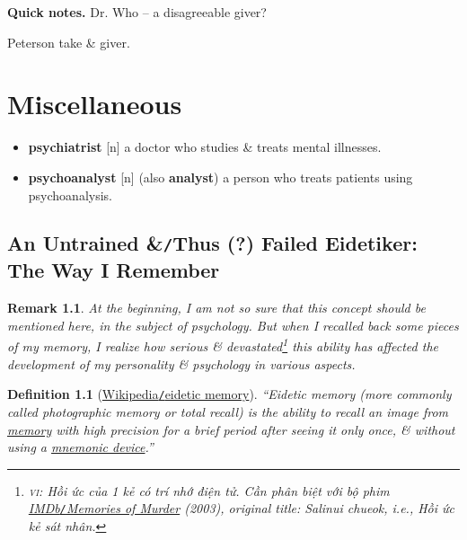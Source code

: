 \documentclass[oneside]{book}
\numberwithin{equation}{section}
\newtheorem{definition}{Definition}[chapter]
\newtheorem{remark}{Remark}[chapter]
\begin{document}
\textbf{Quick notes.} Dr. Who -- a disagreeable giver?

Peterson take \& giver.


\chapter{Miscellaneous}

\begin{itemize}
	\item \textbf{psychiatrist} [n] a doctor who studies \& treats mental illnesses.
	\item \textbf{psychoanalyst} [n] (also \textbf{analyst}) a person who treats patients using psychoanalysis.
\end{itemize}

\section{An Untrained \&\texttt{/}Thus (?) Failed Eidetiker: The Way I Remember}

\begin{remark}
	At the beginning, I am not so sure that this concept should be mentioned here, in the subject of psychology. But when I recalled back some pieces of my memory, I realize how serious \& devastated\footnote{\textsc{vi}: Hồi ức của 1 kẻ có trí nhớ điện tử. Cần phân biệt với bộ phim \href{https://www.imdb.com/title/tt0353969/}{IMDb\texttt{/}Memories of Murder} (2003), original title: Salinui chueok, i.e., Hồi ức kẻ sát nhân.} this ability has affected the development of my personality \& psychology in various aspects.
\end{remark}

\begin{definition}[\href{https://en.wikipedia.org/wiki/Eidetic_memory}{Wikipedia\texttt{/}eidetic memory}]
	``\emph{Eidetic memory} (more commonly called \emph{photographic memory} or \emph{total recall}) is the ability to recall an image from \href{https://en.wikipedia.org/wiki/Memory}{memory} with high precision for a brief period after seeing it only once, \& without using a \href{https://en.wikipedia.org/wiki/Mnemonic_device}{mnemonic device}.''
\end{definition}
\end{document}
